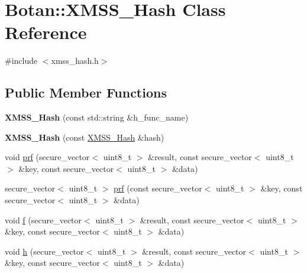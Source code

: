 \hypertarget{class_botan_1_1_x_m_s_s___hash}{}\section{Botan\+:\+:X\+M\+S\+S\+\_\+\+Hash Class Reference}
\label{class_botan_1_1_x_m_s_s___hash}


{\ttfamily \#include $<$xmss\+\_\+hash.\+h$>$}

\subsection*{Public Member Functions}
\begin{DoxyCompactItemize}
\item 
\mbox{\label{class_botan_1_1_x_m_s_s___hash_aa8e3ca390cb1fefb103e286a2c114d63}} 
{\bfseries X\+M\+S\+S\+\_\+\+Hash} (const std\+::string \&h\+\_\+func\+\_\+name)
\item 
\mbox{\label{class_botan_1_1_x_m_s_s___hash_ab5f3b545d9ade5dbe9a2d01d5a41afe8}} 
{\bfseries X\+M\+S\+S\+\_\+\+Hash} (const \mbox{\hyperlink{class_botan_1_1_x_m_s_s___hash}{X\+M\+S\+S\+\_\+\+Hash}} \&hash)
\item 
void \mbox{\hyperlink{class_botan_1_1_x_m_s_s___hash_ae2b2924e198c9ce9313b21457235da18}{prf}} (secure\+\_\+vector$<$ uint8\+\_\+t $>$ \&result, const secure\+\_\+vector$<$ uint8\+\_\+t $>$ \&key, const secure\+\_\+vector$<$ uint8\+\_\+t $>$ \&data)
\item 
secure\+\_\+vector$<$ uint8\+\_\+t $>$ \mbox{\hyperlink{class_botan_1_1_x_m_s_s___hash_a482ef09eb806251e85883850ba9f6df1}{prf}} (const secure\+\_\+vector$<$ uint8\+\_\+t $>$ \&key, const secure\+\_\+vector$<$ uint8\+\_\+t $>$ \&data)
\item 
void \mbox{\hyperlink{class_botan_1_1_x_m_s_s___hash_a142126cdbb5969ffdf13daeb6b903dc2}{f}} (secure\+\_\+vector$<$ uint8\+\_\+t $>$ \&result, const secure\+\_\+vector$<$ uint8\+\_\+t $>$ \&key, const secure\+\_\+vector$<$ uint8\+\_\+t $>$ \&data)
\item 
void \mbox{\hyperlink{class_botan_1_1_x_m_s_s___hash_aa8acd1aad6c7812f858b30e9b2a8cb88}{h}} (secure\+\_\+vector$<$ uint8\+\_\+t $>$ \&result, const secure\+\_\+vector$<$ uint8\+\_\+t $>$ \&key, const secure\+\_\+vector$<$ uint8\+\_\+t $>$ \&data)
\item 

\end{DoxyCompactItemize}
